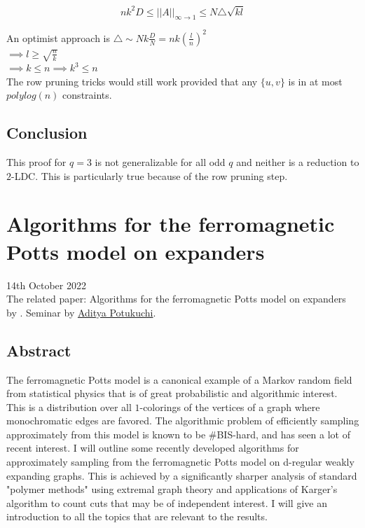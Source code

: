 \documentclass{article}
\begin{document}
\begin{equation*}
nk^2D \leq ||A||_{\infty \to 1} \leq N \triangle \sqrt{kl}
\end{equation*}

\noindent An optimist approach is $\triangle \sim Nk\frac{D}{N} = nk(\frac{l}{n})^2$\\

\noindent $\implies l \geq \sqrt{\frac{n}{k}}$\\

\noindent $\implies k \leq n \implies k^3 \leq n$\\

\noindent The row pruning tricks would still work provided that any $\{u, v\}$ is in at most $polylog(n)$ constraints.

\subsection{Conclusion}

This proof for $q=3$ is not generalizable for all odd $q$ and neither is a reduction to $2$-LDC. This is particularly true because of the row pruning step.

\newpage
\section{Algorithms for the ferromagnetic Potts model on expanders}

14th October 2022\\

\noindent The related paper: Algorithms for the ferromagnetic Potts model on expanders by \citet{https://doi.org/10.48550/arxiv.2204.01923}. Seminar by \href{https://www.adityapotukuchi.com/}{Aditya Potukuchi}.

\subsection{Abstract}

\noindent The ferromagnetic Potts model is a canonical example of a Markov random field from statistical physics that is of great probabilistic and algorithmic interest. This is a distribution over all $1$-colorings of the vertices of a graph where monochromatic edges are favored. The algorithmic problem of efficiently sampling approximately from this model is known to be \#BIS-hard, and has seen a lot of recent interest. I will outline some recently developed algorithms for approximately sampling from the ferromagnetic Potts model on d-regular weakly expanding graphs. This is achieved by a significantly sharper analysis of standard "polymer methods" using extremal graph theory and applications of Karger's algorithm to count cuts that may be of independent interest. I will give an introduction to all the topics that are relevant to the results.
\end{document}

